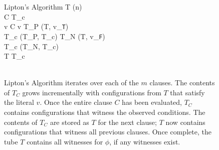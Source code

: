 
\begin{figure}[htbp]
\begin{center}
	\begin{pseudocode}{Lipton's Algorithm}{\phi}
	T \GETS {}(n) \\
	\FOREACH {} C  \phi \DO
		\BEGIN
		T_c \GETS \emptyset \\
		\FOREACH {} v  C \DO
			\BEGIN
				\IF v  \THEN
					\BEGIN
						T_P \GETS {}(T, v_{\texttt{T}})\\
						T_c \GETS {}(T_P, T_c)						
					\END
				\ELSE
					\BEGIN
						T_N \GETS {}(T, v_{\texttt{F}})\\
						T_c \GETS {}(T_N, T_c)						
					\END
			\END
		\\
		T \GETS {}T_c\text{)} \\
		\END
	\\
	\end{pseudocode}

\caption{{\sc Lipton's Algorithm} iterates over each of the $m$ clauses.  The contents of $T_C$ grows incrementally with configurations from $T$ that satisfy the literal $v$.  Once the entire clause $C$ has been evaluated, $T_C$ contains configurations that witness the observed conditions.  The contents of $T_C$ are stored as $T$ for the next clause; $T$ now contains configurations that witness all previous clauses.  Once complete, the tube $T$ contains all witnesses for $\phi$, if any witnesses exist.}
\label{liptonAlgorithm}
\end{center}
\end{figure}

